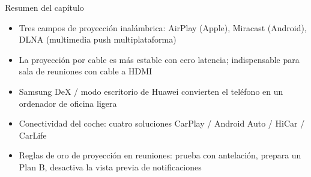\begin{tcbsummary}{Resumen del capítulo}
\begin{itemize}
  \item Tres campos de proyección inalámbrica: AirPlay (Apple), Miracast (Android), DLNA (multimedia push multiplataforma)
  \item La proyección por cable es más estable con cero latencia; indispensable para sala de reuniones con cable a HDMI
  \item Samsung DeX / modo escritorio de Huawei convierten el teléfono en un ordenador de oficina ligera
  \item Conectividad del coche: cuatro soluciones CarPlay / Android Auto / HiCar / CarLife
  \item Reglas de oro de proyección en reuniones: prueba con antelación, prepara un Plan B, desactiva la vista previa de notificaciones
\end{itemize}

\end{tcbsummary}

